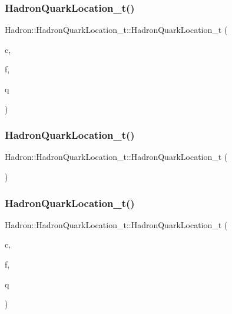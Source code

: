 \subsubsection{\texorpdfstring{HadronQuarkLocation\_t()}{HadronQuarkLocation\_t()}\hspace{0.1cm}{\footnotesize\ttfamily [2/4]}}
{\footnotesize\ttfamily Hadron\+::\+Hadron\+Quark\+Location\+\_\+t\+::\+Hadron\+Quark\+Location\+\_\+t (\begin{DoxyParamCaption}\item[{bool}]{c,  }\item[{char}]{f,  }\item[{const \mbox{\hyperlink{structHadron_1_1QuarkNum__t}{Quark\+Num\+\_\+t}} \&}]{q }\end{DoxyParamCaption})\hspace{0.3cm}{\ttfamily [inline]}}

\mbox{\label{structHadron_1_1HadronQuarkLocation__t_a134386bb80be45cf0767a6c45e3b6f52}} 
\subsubsection{\texorpdfstring{HadronQuarkLocation\_t()}{HadronQuarkLocation\_t()}\hspace{0.1cm}{\footnotesize\ttfamily [3/4]}}
{\footnotesize\ttfamily Hadron\+::\+Hadron\+Quark\+Location\+\_\+t\+::\+Hadron\+Quark\+Location\+\_\+t (\begin{DoxyParamCaption}{ }\end{DoxyParamCaption})\hspace{0.3cm}{\ttfamily [inline]}}

\mbox{\label{structHadron_1_1HadronQuarkLocation__t_a214dddf7650dc22b5c424715fc27dd42}} 
\subsubsection{\texorpdfstring{HadronQuarkLocation\_t()}{HadronQuarkLocation\_t()}\hspace{0.1cm}{\footnotesize\ttfamily [4/4]}}
{\footnotesize\ttfamily Hadron\+::\+Hadron\+Quark\+Location\+\_\+t\+::\+Hadron\+Quark\+Location\+\_\+t (\begin{DoxyParamCaption}\item[{bool}]{c,  }\item[{char}]{f,  }\item[{const \mbox{\hyperlink{structHadron_1_1QuarkNum__t}{Quark\+Num\+\_\+t}} \&}]{q }\end{DoxyParamCaption})\hspace{0.3cm}{\ttfamily [inline]}}



